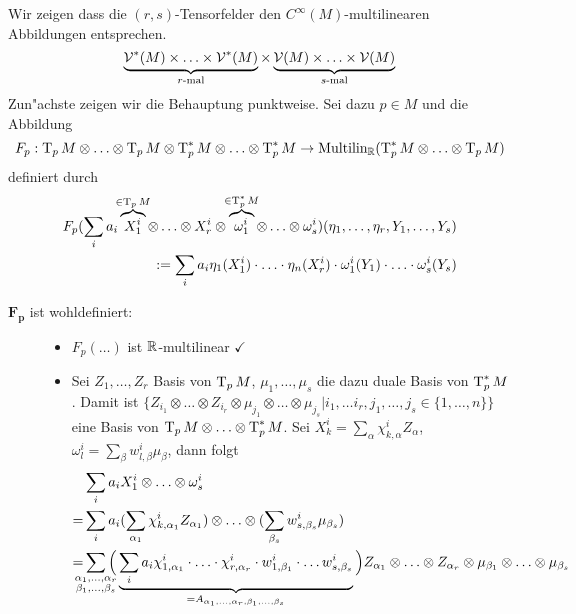 \begin{Loes}\label{exc:ueb5-a1}
Wir zeigen dass die $(r,s)$-Tensorfelder den $C^\infty(M)$-multilinearen Abbildungen entsprechen.
	\[ \underbrace{\operatorname{\mathcal{V}}^*(M) \times \ldots \times \operatorname{\mathcal{V}}^*(M)}_{r\text{-mal}} \times \underbrace{\operatorname{\mathcal{V}}(M) \times \ldots \times \operatorname{\mathcal{V}}(M)}_{s\text{-mal}} \]
Zun"achste zeigen wir die Behauptung punktweise. Sei dazu $p \in M$ und die Abbildung
	\[ F_p: \operatorname{T}_pM \otimes \ldots \otimes \operatorname{T}_pM \otimes \operatorname{T}_p^*M \otimes \ldots \otimes \operatorname{T}_p^*M \to \text{Multilin}_{\operatorname{\mathbb{R}}}(\operatorname{T}_p^*M \otimes \ldots \otimes \operatorname{T}_pM) \]
definiert durch
\begin{align*}
	F_p(\sum_i a_i \overbrace{X_1^{i}}^{\mathclap{\in \T_pM}} \otimes \ldots \otimes X_r^{i} \otimes \overbrace{\omega_1^{i}}^{\mathclap{\in \T_p^*M}} \otimes \ldots \otimes \omega_s^{i})(\eta_1,\ldots ,\eta_r, Y_1, \ldots ,Y_s)\\
	\qquad := \sum_i a_i \eta_1(X_1^{i}) \cdot \ldots \cdot \eta_n(X_r^{i}) \cdot \omega_1^{i}(Y_1) \cdot \ldots \cdot \omega_s^{i}(Y_s)
\end{align*}
\begin{description}
\item[$\bm{F_p}$ ist wohldefiniert:]
	\begin{itemize}[leftmargin=*]
		\item
			$F_p(\ldots)$ ist $\operatorname{\mathbb{R}}$-multilinear $\checkmark$
		\item
			Sei $Z_1,\ldots ,Z_r$ Basis von $\operatorname{T}_pM$, $\mu_1,\ldots ,\mu_s$ die dazu duale Basis von $\operatorname{T}_p^*M$. Damit ist $\{Z_{i_1} \otimes \ldots \otimes Z_{i_r} \otimes \mu_{j_1} \otimes \ldots \otimes \mu_{j_s} | i_1, \ldots i_r, j_1, \ldots , j_s \in \{1,\ldots ,n\}\}$ eine Basis von $\operatorname{T}_pM \otimes \ldots \otimes \operatorname{T}_p^*M$. Sei $X_k^{i} = \sum_\alpha \chi_{k, \alpha}^{i} Z_\alpha$, $\omega_l^{i} = \sum_\beta w_{l, \beta}^{i} \mu_\beta$, dann folgt
			\begin{align*}
				& \sum_i a_i X_1^{i} \otimes \ldots \otimes \omega_s^{i}\\
				=& \sum_i a_i (\sum_{\alpha_1} \chi_{k, \alpha_1}^{i} Z_{\alpha_1}) \otimes \ldots  \otimes (\sum_{\beta_s} w_{s, \beta_s}^{i} \mu_{\beta_s})\\
				=& \sum_{\mathclap{\substack{\alpha_1,\ldots ,\alpha_r \\ \beta_1,\ldots ,\beta_s}}} \Big( \underbrace{\sum_i a_i \chi_{1,\alpha_1}^{i} \cdot \ldots \cdot \chi_{r,\alpha_r}^{i} \cdot w_{1, \beta_1}^{i} \cdot \ldots w_{s, \beta_s}^{i} }_{= A_{\alpha_1,\ldots , \alpha_r, \beta_1, \ldots ,\beta_s}} \Big) Z_{\alpha_1} \otimes \ldots \otimes Z_{\alpha_r} \otimes \mu_{\beta_1} \otimes \ldots \otimes \mu_{\beta_s}

\end{align*}
\end{itemize}
\end{description}
\end{Loes}
